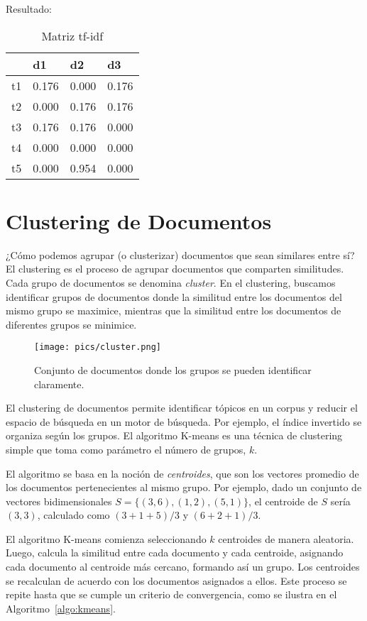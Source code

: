 Resultado:
 \begin{table}[h]
 \centering
\begin{tabular}{|l|r|r|r|}
\hline
 & \multicolumn{1}{l|}{d1} & \multicolumn{1}{l|}{d2} & \multicolumn{1}{l|}{d3} \\ \hline
t1 & 0.176 & 0.000 & 0.176 \\ \hline
t2 & 0.000 & 0.176 & 0.176 \\ \hline
t3 & 0.176 & 0.176 & 0.000 \\ \hline
t4 & 0.000 & 0.000 & 0.000 \\ \hline
t5 & 0.000 & 0.954 & 0.000 \\ \hline
\end{tabular}
\caption{Matriz tf-idf}
\end{table}
\section{Clustering de Documentos}

¿Cómo podemos agrupar (o clusterizar) documentos que sean similares entre sí? El clustering es el proceso de agrupar documentos que comparten similitudes. Cada grupo de documentos se denomina \emph{cluster}. En el clustering, buscamos identificar grupos de documentos donde la similitud entre los documentos del mismo grupo se maximice, mientras que la similitud entre los documentos de diferentes grupos se minimice.

\begin{figure}[h!]
\centering
\texttt{[image: pics/cluster.png]}
\caption{Conjunto de documentos donde los grupos se pueden identificar claramente.}
\end{figure}

El clustering de documentos permite identificar tópicos en un corpus y reducir el espacio de búsqueda en un motor de búsqueda. Por ejemplo, el índice invertido se organiza según los grupos. El algoritmo K-means es una técnica de clustering simple que toma como parámetro el número de grupos, $k$.

El algoritmo se basa en la noción de \emph{centroides}, que son los vectores promedio de los documentos pertenecientes al mismo grupo. Por ejemplo, dado un conjunto de vectores bidimensionales $S = \{(3,6), (1,2), (5,1)\}$, el centroide de $S$ sería $(3,3)$, calculado como $(3+1+5)/3$ y $(6+2+1)/3$.

El algoritmo K-means comienza seleccionando $k$ centroides de manera aleatoria. Luego, calcula la similitud entre cada documento y cada centroide, asignando cada documento al centroide más cercano, formando así un grupo. Los centroides se recalculan de acuerdo con los documentos asignados a ellos. Este proceso se repite hasta que se cumple un criterio de convergencia, como se ilustra en el Algoritmo~\ref{algo:kmeans}.


